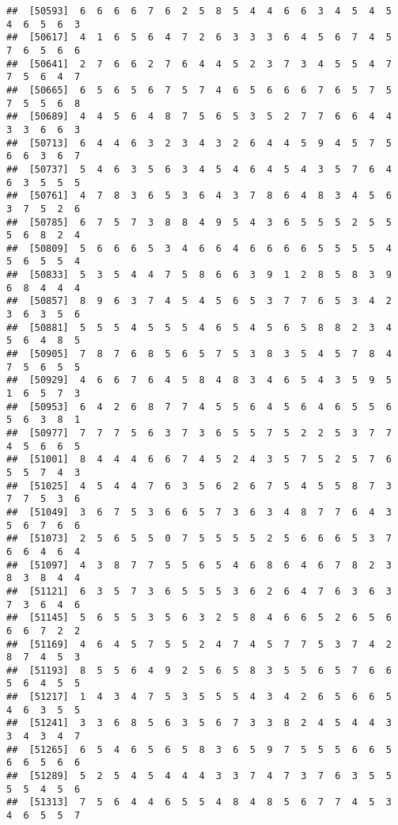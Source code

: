 \documentclass[
]{book}
\begin{document}
\begin{verbatim}
##  [50593]  6  6  6  6  7  6  2  5  8  5  4  4  6  6  3  4  5  4  5  4  6  5  6  3
##  [50617]  4  1  6  5  6  4  7  2  6  3  3  3  6  4  5  6  7  4  5  7  6  5  6  6
##  [50641]  2  7  6  6  2  7  6  4  4  5  2  3  7  3  4  5  5  4  7  7  5  6  4  7
##  [50665]  6  5  6  5  6  7  5  7  4  6  5  6  6  6  7  6  5  7  5  7  5  5  6  8
##  [50689]  4  4  5  6  4  8  7  5  6  5  3  5  2  7  7  6  6  4  4  3  3  6  6  3
##  [50713]  6  4  4  6  3  2  3  4  3  2  6  4  4  5  9  4  5  7  5  6  6  3  6  7
##  [50737]  5  4  6  3  5  6  3  4  5  4  6  4  5  4  3  5  7  6  4  6  3  5  5  5
##  [50761]  4  7  8  3  6  5  3  6  4  3  7  8  6  4  8  3  4  5  6  3  7  5  2  6
##  [50785]  6  7  5  7  3  8  8  4  9  5  4  3  6  5  5  5  2  5  5  5  6  8  2  4
##  [50809]  5  6  6  6  5  3  4  6  6  4  6  6  6  6  5  5  5  5  4  5  6  5  5  4
##  [50833]  5  3  5  4  4  7  5  8  6  6  3  9  1  2  8  5  8  3  9  6  8  4  4  4
##  [50857]  8  9  6  3  7  4  5  4  5  6  5  3  7  7  6  5  3  4  2  3  6  3  5  6
##  [50881]  5  5  5  4  5  5  5  4  6  5  4  5  6  5  8  8  2  3  4  5  6  4  8  5
##  [50905]  7  8  7  6  8  5  6  5  7  5  3  8  3  5  4  5  7  8  4  7  5  6  5  5
##  [50929]  4  6  6  7  6  4  5  8  4  8  3  4  6  5  4  3  5  9  5  1  6  5  7  3
##  [50953]  6  4  2  6  8  7  7  4  5  5  6  4  5  6  4  6  5  5  6  5  6  3  8  1
##  [50977]  7  7  7  5  6  3  7  3  6  5  5  7  5  2  2  5  3  7  7  4  5  6  6  5
##  [51001]  8  4  4  4  6  6  7  4  5  2  4  3  5  7  5  2  5  7  6  5  5  7  4  3
##  [51025]  4  5  4  4  7  6  3  5  6  2  6  7  5  4  5  5  8  7  3  7  7  5  3  6
##  [51049]  3  6  7  5  3  6  6  5  7  3  6  3  4  8  7  7  6  4  3  5  6  7  6  6
##  [51073]  2  5  6  5  5  0  7  5  5  5  5  2  5  6  6  6  5  3  7  6  6  4  6  4
##  [51097]  4  3  8  7  7  5  5  6  5  4  6  8  6  4  6  7  8  2  3  8  3  8  4  4
##  [51121]  6  3  5  7  3  6  5  5  5  3  6  2  6  4  7  6  3  6  3  7  3  6  4  6
##  [51145]  5  6  5  5  3  5  6  3  2  5  8  4  6  6  5  2  6  5  6  6  6  7  2  2
##  [51169]  4  6  4  5  7  5  5  2  4  7  4  5  7  7  5  3  7  4  2  8  7  4  5  3
##  [51193]  8  5  5  6  4  9  2  5  6  5  8  3  5  5  6  5  7  6  6  5  6  4  5  5
##  [51217]  1  4  3  4  7  5  3  5  5  5  4  3  4  2  6  5  6  6  5  4  6  3  5  5
##  [51241]  3  3  6  8  5  6  3  5  6  7  3  3  8  2  4  5  4  4  3  3  4  3  4  7
##  [51265]  6  5  4  6  5  6  5  8  3  6  5  9  7  5  5  5  6  6  5  6  6  5  6  6
##  [51289]  5  2  5  4  5  4  4  4  3  3  7  4  7  3  7  6  3  5  5  5  5  4  5  6
##  [51313]  7  5  6  4  4  6  5  5  4  8  4  8  5  6  7  7  4  5  3  4  6  5  5  7

\end{verbatim}
\end{document}
